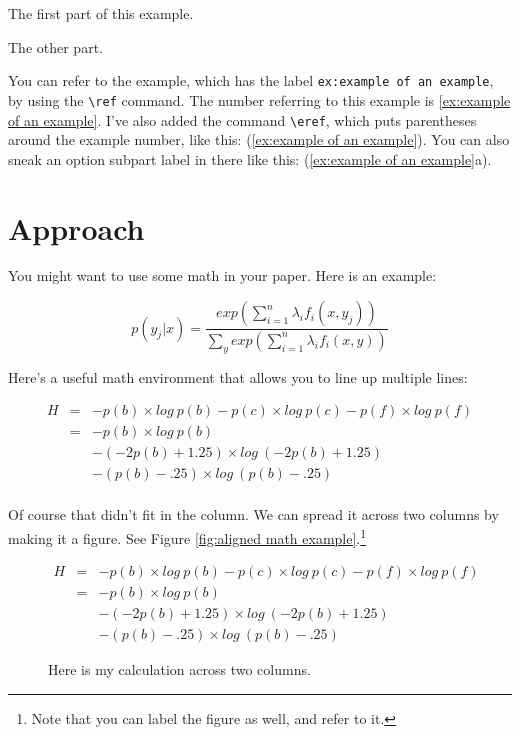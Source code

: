 \documentclass[11pt]{article}
\newcommand{\eref}[2][]{(\ref{#2}#1)}
\begin{document}
\begin{examples}
\item   \label{ex:example of an example}
  \begin{subexamples}
  \item \label{ex:subpart}  The first part of this example.
  \item   The other part.
  \end{subexamples}
\end{examples}

You can refer to the example, which has the label
\verb+ex:example of an example+, by using the \verb+\ref+ command. The
number referring to this example is \ref{ex:example of an
example}. I've also added the command \verb+\eref+, which puts
parentheses around the example number, like this: \eref{ex:example of
an example}. You can also sneak an option subpart label in there like
this: \eref[a]{ex:example of an example}.


\section{Approach}

You might want to use some math in your paper. Here is an example:

\[ 
p(y_j|x) = \frac{exp(\sum_{i=1}^n \lambda_i f_i(x,y_j))}{\sum_y exp(\sum_{i=1}^n \lambda_i f_i(x,y))}   
\]

Here's a useful math environment that allows you to line up multiple lines:

\begin{eqnarray*}
  H & = & -p(b)\times log~p(b) - p(c)\times log~p(c) - p(f)\times log~p(f)\\
  & = & -p(b) \times log~p(b) \\
  &   & - (-2p(b)+1.25) \times log~(-2p(b)+1.25)\\
  &   & - (p(b)-.25)\times log~(p(b)-.25)\\
\end{eqnarray*}

Of course that didn't fit in the column. We can spread it across two
columns by making it a figure. See Figure \ref{fig:aligned math
example}.\footnote{Note that you can label the figure as well, and
refer to it.}

\begin{figure*}
\begin{eqnarray*}
  H & = & -p(b)\times log~p(b) - p(c)\times log~p(c) - p(f)\times log~p(f)\\
  & = & -p(b) \times log~p(b) \\
  &   & - (-2p(b)+1.25) \times log~(-2p(b)+1.25)\\
  &   & - (p(b)-.25)\times log~(p(b)-.25)
\end{eqnarray*}
\caption{Here is my calculation across two columns.}
\label{fig:aligned math example}
\end{figure*}
\end{document}
